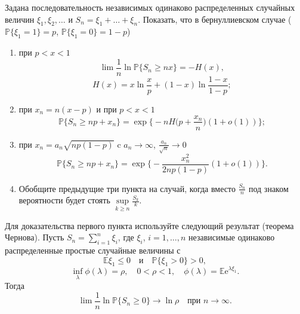 \begin{problem}
\label{chernov_th}
 Задана последовательность независимых одинаково распределенных случайных величин $\xi_1,\xi_2,\dots$ и $S_n = \xi_1+\dots+\xi_n$.
Показать, что в бернуллиевском случае ($\mathbb{P}\{\xi_1=1\} = p$, $\mathbb{P}\{\xi_1 = 0\}=1-p$) 
\begin{enumerate}
\item  при  $p<x<1$
\begin{equation*}
\lim\frac{1}{n}\ln\mathbb{P}\{S_n\geq nx\} = -H(x),
\end{equation*}
\begin{equation*}
H(x) = x\ln \frac{x}{p}+(1-x)\ln\frac{1-x}{1-p};
\end{equation*}
\item при $x_n = n(x-p)$ и при  $p<x<1$
\begin{equation*}
\mathbb{P}\{S_n\geq np+x_n\}=\exp\biggl\{-nH\biggl(p+\frac{x_n}{n}\biggr)(1+o(1))\biggr\};
\end{equation*}
\item при $x_n = a_n\sqrt{np(1-p)}$ c $a_n\to\infty$, $\frac{a_n}{\sqrt{n}}\to 0$
\begin{equation*}
\mathbb{P}\{S_n\geq np+x_n\}  = \exp\biggl\{-\frac{x_n^2}{2np(1-p)}(1+o(1))\biggr\}.
\end{equation*}

\item Обобщите предыдущие три пункта на случай, когда вместо $\frac{S_n}{n}$ под знаком вероятности будет стоять $\underset{k\geq n}{\sup}\frac{S_k}{k}$.

\end{enumerate}
\end{problem}
\begin{ordre}
Для доказательства первого пункта используйте следующий результат (теорема Чернова). Пусть $S_n = \sum_{i=1}^n\xi_i$, где $\xi_i$, $i=1,\dots,n$ независимые одинаково распределенные простые случайные величины с 
$$
\mathbb{E}\xi_1\leq 0 \quad \text{и} \quad \mathbb{P}\{\xi_1>0\}>0
,
$$
$$
\inf_{\lambda}\phi(\lambda)=\rho,\quad 0<\rho<1, \quad \phi(\lambda) = \mathbb{E}\text{e}^{\lambda\xi_1}.
$$
Тогда
\begin{equation*}
\lim\frac{1}{n}\ln\mathbb{P}\{S_n\geq 0\} \to \ln\rho\quad \text{при~}n\to\infty.
\end{equation*}
\end{ordre}



